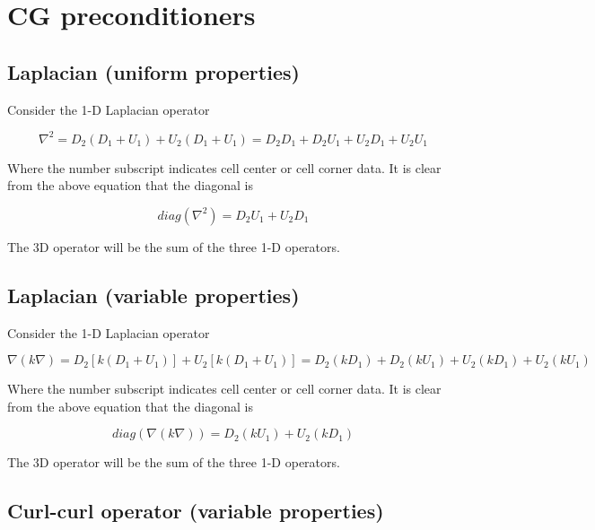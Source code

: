 \documentclass[11pt]{article}
\begin{document}
\doublespacing
\MOONSTITLE

\section{CG preconditioners}

\subsection{Laplacian (uniform properties)}
Consider the 1-D Laplacian operator

\begin{equation}
  \nabla^2 = D_2(D_1 + U_1) + U_2(D_1 + U_1)
  = D_2D_1 + D_2U_1 + U_2D_1 + U_2U_1
\end{equation}

Where the number subscript indicates cell center or cell corner data. It is clear from the above equation that the diagonal is

\begin{equation}
  diag(\nabla^2) = D_2U_1 + U_2D_1
\end{equation}

The 3D operator will be the sum of the three 1-D operators.

\subsection{Laplacian (variable properties)}
Consider the 1-D Laplacian operator

\begin{equation}
  \nabla (k\nabla) = D_2 [k(D_1 + U_1)] + U_2 [k(D_1 + U_1)]
  = D_2(kD_1) + D_2(kU_1) + U_2(kD_1) + U_2(kU_1)
\end{equation}

Where the number subscript indicates cell center or cell corner data. It is clear from the above equation that the diagonal is

\begin{equation}
  diag(\nabla (k\nabla)) = D_2(kU_1) + U_2(kD_1)
\end{equation}

The 3D operator will be the sum of the three 1-D operators.

\subsection{Curl-curl operator (variable properties)}
\end{document}
